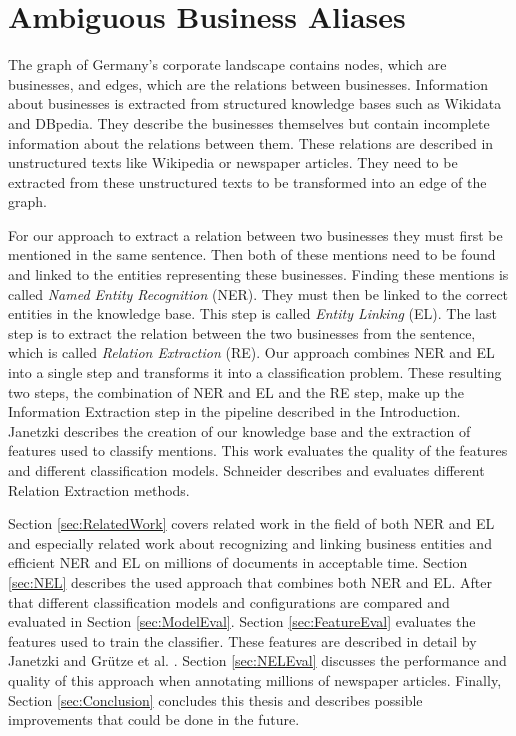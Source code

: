 \section{Ambiguous Business Aliases}
\label{sec:IntroABA}
The graph of Germany's corporate landscape contains nodes, which are businesses, and edges, which are the relations between businesses. Information about businesses is extracted from structured knowledge bases such as Wikidata and DBpedia. They describe the businesses themselves but contain incomplete information about the relations between them. These relations are described in unstructured texts like Wikipedia or newspaper articles. They need to be extracted from these unstructured texts to be transformed into an edge of the graph.\par
For our approach to extract a relation between two businesses they must first be mentioned in the same sentence. Then both of these mentions need to be found and linked to the entities representing these businesses. Finding these mentions is called \textit{Named Entity Recognition} (NER). They must then be linked to the correct entities in the knowledge base. This step is called \textit{Entity Linking} (EL). The last step is to extract the relation between the two businesses from the sentence, which is called \textit{Relation Extraction} (RE). Our approach combines NER and EL into a single step and transforms it into a classification problem. These resulting two steps, the combination of NER and EL and the RE step, make up the Information Extraction step in the pipeline described in the Introduction. Janetzki \cite{janetzki} describes the creation of our knowledge base and the extraction of features used to classify mentions. This work evaluates the quality of the features and different classification models. Schneider \cite{schneider} describes and evaluates different Relation Extraction methods.\par
Section \ref{sec:RelatedWork} covers related work in the field of both NER and EL and especially related work about recognizing and linking business entities and efficient NER and EL on millions of documents in acceptable time. Section \ref{sec:NEL} describes the used approach that combines both NER and EL. After that different classification models and configurations are compared and evaluated in Section \ref{sec:ModelEval}. Section \ref{sec:FeatureEval} evaluates the features used to train the classifier. These features are described in detail by Janetzki \cite{janetzki} and Grütze et al. \cite{coheel}. Section \ref{sec:NELEval} discusses the performance and quality of this approach when annotating millions of newspaper articles. Finally, Section \ref{sec:Conclusion} concludes this thesis and describes possible improvements that could be done in the future.
